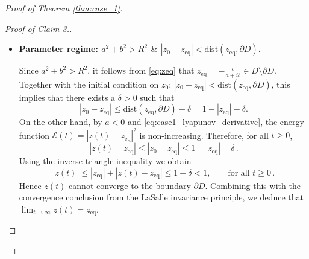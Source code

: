 \documentclass[10pt]{article}
\theoremstyle{definition}
\theoremstyle{definition}
\numberwithin{equation}{section}
\newcommand{\CE}{\mathcal{E}}
\newcommand{\CR}{\mathcal{R}}
\newcommand{\Drho}{\Dot{\rho}}
\newcommand{\rhoTH}{\rho_{\mathrm{th}}}
\newcommand{\zeq}{z_{\mathrm{eq}}}
\newcommand{\PhiA}{\Phi_{A}}
\begin{document}
\begin{proof}[Proof of Theorem \ref{thm:case_1}]
\begin{proof}[Proof of Claim 3.]
\begin{itemize}
        Plugging the polar representation of the order parameter $z(t) = \CR_2(t) = \rho(t) e^{i\phi(t)}$ in \eqref{eqn:case1_complex}, together with $\PhiA = \arg(c)$, we obtain the dynamics of $\rho$ as
        \begin{equation*}
        \Drho = \frac{1}{4} (1 - \rho^2) (a \rho + R \cos (\phi - \PhiA)) \,  .
        \end{equation*}
        Now fix any $\rho \in (\rhoTH, 1)$, where $\rhoTH := \frac{R}{|a|} \in (0,1)$.
        Since $a < 0$, we have
        \begin{equation*}
        a \rho + R \cos (\phi - \PhiA) \leq a \rho + R < a \rhoTH + R = 0 .
        \end{equation*}
        Moreover, for $\rho \in (\rhoTH,1)$, we have $1 - \rho^2 > 0$. 
        Hence $\Drho < 0$ whenever $\rho \in (\rhoTH,1)$.
        This shows that the trajectory of $\rho(t)$ cannot approach $\rho = 1$ within the interval $(0,1)$. Equivalently, for every initial condition $z_0 \notin \partial D$, we have $z(t) \nrightarrow \partial D$.
        Combining with the conclusion from the LaSalle invariance principle, we therefore obtain $\lim_{t \rightarrow \infty} z(t) = \zeq$.

        \item \textbf{Parameter regime: $a^2 + b^2 > R^2$ $\&$ $|z_0 - \zeq| < \mathrm{dist} (\zeq, \partial D)$.}

        Since $a^2 + b^2 > R^2$, it follows from \eqref{eq:zeq} that $\zeq = -\frac{c}{a + ib} \in D \setminus \partial D$.
        Together with the initial condition on $z_0$: $|z_0 - \zeq| < \mathrm{dist} (\zeq, \partial D)$, this implies that there exists a $\delta > 0$ such that
        \begin{equation*}
        |z_0 - \zeq| \leq \mathrm{dist} (\zeq, \partial D) - \delta = 1 - |\zeq| - \delta .
        \end{equation*}
        On the other hand, by $a<0$ and \eqref{eq:case1_lyapunov_derivative}, the energy function $\CE(t) = |z(t) - \zeq|^2$ is non-increasing.
        Therefore, for all $t \geq 0$,
        \begin{equation*}
        |z(t) - \zeq| \leq |z_0 - \zeq| \leq 1 - |\zeq| - \delta \,.
        \end{equation*}
        Using the inverse triangle inequality we obtain 
        \begin{equation*}
            |z(t)| \leq |\zeq| + |z(t) - \zeq| \leq 1 - \delta < 1, \qquad \text{for all } t \geq 0 \, .
        \end{equation*}
        Hence $z(t)$ cannot converge to the boundary $\partial D$.
        Combining this with the convergence conclusion from the LaSalle invariance principle, we deduce that $\lim_{t \rightarrow \infty} z(t) = \zeq$. 
        \end{itemize}
    

\end{proof}
\end{proof}
\end{document}
